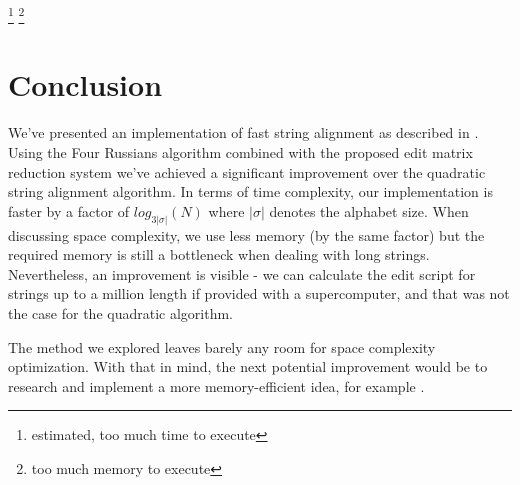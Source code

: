 \documentclass[times, utf8, seminar, numeric]{fer}
\begin{document}
\footnote{estimated, too much time to execute}
\footnote{too much memory to execute}

\chapter{Conclusion}
We've presented an implementation of fast string alignment as described in \cite{masek1980faster}. Using the Four Russians algorithm combined with the proposed edit matrix reduction system we've achieved a significant improvement over the quadratic string alignment algorithm. In terms of time complexity, our implementation is faster by a factor of $log_{3|\sigma|}(N)$ where $|\sigma|$ denotes the alphabet size. When discussing space complexity, we use less memory (by the same factor) but the required memory is still a bottleneck when dealing with long strings. Nevertheless, an improvement is visible - we can calculate the edit script for strings up to a million length if provided with a supercomputer, and that was not the case for the quadratic algorithm.

The method we explored leaves barely any room for space complexity optimization. With that in mind, the next potential improvement would be to research and implement a more memory-efficient idea, for example \cite{kundeti2008extending}.




\nocite{*}
\end{document}
